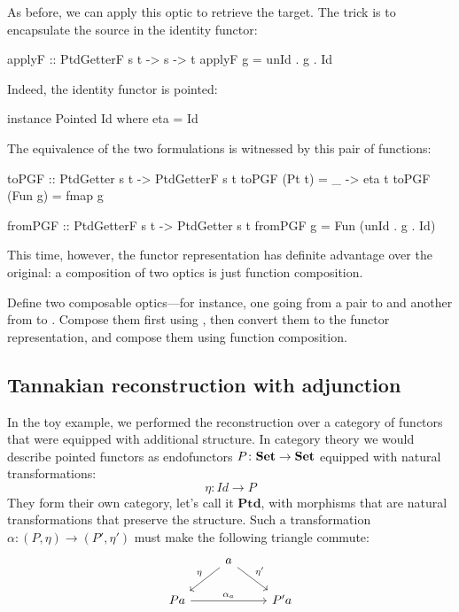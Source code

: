 \documentclass[DaoFP]{subfiles}
\begin{document}
As before, we can apply this optic to retrieve the target. The trick is to encapsulate the source in the identity functor:
\begin{haskell}
applyF :: PtdGetterF s t -> s -> t
applyF g = unId . g . Id
\end{haskell}
Indeed, the identity functor is pointed:
\begin{haskell}
instance Pointed Id where
  eta = Id
\end{haskell}

The equivalence of the two formulations is witnessed by this pair of functions:
\begin{haskell}
toPGF :: PtdGetter s t -> PtdGetterF s t
toPGF (Pt t) = \_ -> eta t
toPGF (Fun g) = fmap g

fromPGF :: PtdGetterF s t -> PtdGetter s t
fromPGF g = Fun (unId . g . Id)
\end{haskell}
This time, however, the functor representation has definite advantage over the original: a composition of two  optics is just function composition.
\begin{exercise}
Define two composable  optics---for instance, one going from a pair  to  and another from  to . Compose them first using , then convert them to the functor representation, and compose them using function composition.
\end{exercise}


\subsection{Tannakian reconstruction with adjunction}

In the toy example, we performed the reconstruction over a category of functors that were equipped with additional structure. In category theory we would describe pointed functors as endofunctors $P \colon \mathbf{Set} \to \mathbf{Set}$ equipped with natural transformations:
\[ \eta \colon Id \to P \]
They form their own category, let's call it $\mathbf{Ptd}$,  with morphisms that are natural transformations that preserve the structure. Such a transformation $\alpha \colon (P, \eta) \to (P', \eta')$ must make the following triangle commute:
\[
 \begin{tikzcd}
 & a
 \arrow[dl, "\eta"']
 \arrow[dr, "\eta'"]
 \\
 P a
 \arrow[rr, "\alpha_a"]
 && P' a
 \end{tikzcd}
\]
\end{document}
